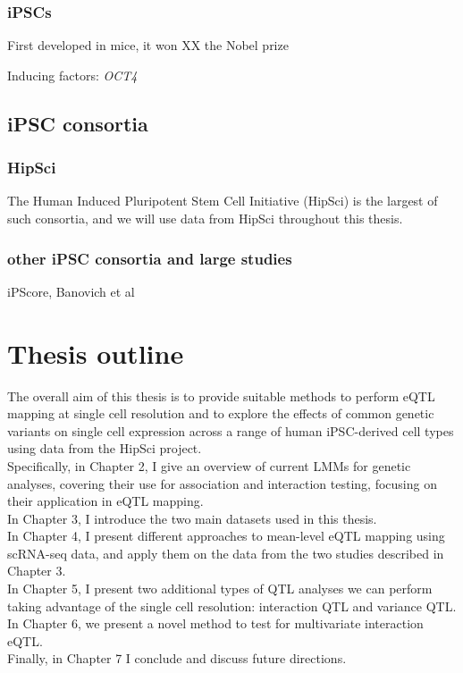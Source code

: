 \cite{kimbrel2015current}

\subsubsection{iPSCs}

First developed in mice, it won XX the Nobel prize

Inducing factors:
\textit{OCT4}


\subsection{iPSC consortia}

\subsubsection{HipSci}
The Human Induced Pluripotent Stem Cell Initiative (HipSci) is the largest of such consortia, and we will use data from HipSci throughout this thesis.

\subsubsection{other iPSC consortia and large studies}

iPScore, Banovich et al

\newpage

\section{Thesis outline}

The overall aim of this thesis is to provide suitable methods to perform eQTL mapping at single cell resolution and to explore the effects of common genetic variants on single cell expression across a range of human iPSC-derived cell types using data from the HipSci project.\\

Specifically, in Chapter 2, I give an overview of current LMMs for genetic analyses, covering their use for association and interaction testing, focusing on their application in eQTL mapping.\\

In Chapter 3, I introduce the two main datasets used in this thesis. \\

In Chapter 4, I present different approaches to mean-level eQTL mapping using scRNA-seq data, and apply them on the data from the two studies described in Chapter 3. \\

In Chapter 5, I present two additional types of QTL analyses we can perform taking advantage of the single cell resolution: interaction QTL and variance QTL. \\

In Chapter 6, we present a novel method to test for multivariate interaction eQTL. \\

Finally, in Chapter 7 I conclude and discuss future directions.